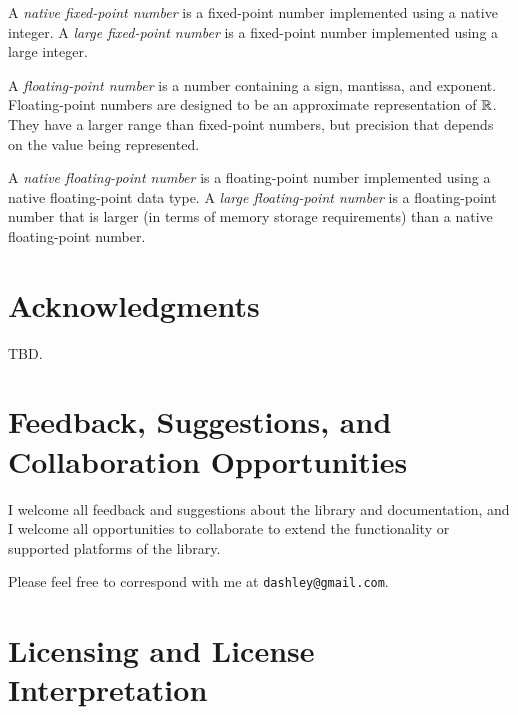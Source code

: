 A \emph{native fixed-point number} is a fixed-point number implemented using
a native integer.  A \emph{large fixed-point number} is a fixed-point number
implemented using a large integer.

A \emph{floating-point number} is a number 
containing a sign, mantissa, and exponent.  Floating-point numbers are 
designed to be an approximate representation of ${\mathbb{R}}$.  They 
have a larger range than fixed-point numbers, but precision that depends 
on the value being represented.  

A \emph{native floating-point number} is a floating-point number 
implemented using a native floating-point data type.  A \emph{large 
floating-point number} is a floating-point number that is larger (in terms 
of memory storage requirements) than a native floating-point number.  


\section{Acknowledgments}
\label{ciov0:sack0}
 
TBD. 


\section{Feedback, Suggestions, and Collaboration Opportunities}
\label{ciov0:sfbk0}

I welcome all feedback and suggestions about the library and 
documentation, and I welcome all opportunities to collaborate to extend 
the functionality or supported platforms of the library.  

Please feel free to correspond with me at \texttt{dashley@\-gmail.com}.


\section{Licensing and License Interpretation}
\label{ciov0:slip0}

